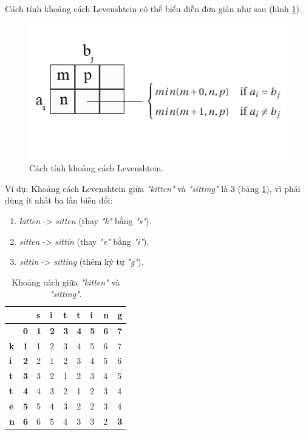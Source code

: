 
Cách tính khoảng cách Levenshtein có thể biểu diễn đơn giản như sau (hình \ref{fig:levdis}).
\begin{figure}[H]
	\centering
		\includegraphics[width=0.7\columnwidth]{chapter07/figure-sec4/levdis.png}
		\centering
	\caption{Cách tính khoảng cách Levenshtein.}
	\label{fig:levdis}
\end{figure}

Ví dụ: Khoảng cách Levenshtein giữa \textit{"kitten"} và \textit{"sitting"} là 3 (bảng \ref{Tab:kitten-sitting}), vì phải dùng ít nhất ba lần biến đổi:
\begin{enumerate}
    \item \textit{kitten} -> \textit{sitten} (thay \textit{"k"} bằng \textit{"s"}).
    \item \textit{sitten} -> \textit{sittin} (thay \textit{"e"} bằng \textit{"i"}).
    \item \textit{sittin} -> \textit{sitting} (thêm ký tự \textit{"g"}).
\end{enumerate}

\begin{table}[H]
\caption{Khoảng cách giữa \textit{"kitten"} và \textit{"sitting"}.}
\centering
    \begin{tabular}{|l|l|l|l|l|l|l|l|l|}
    \hline
     &  & \textbf{s} & \textbf{i} & \textbf{t} & \textbf{t} & \textbf{i} & \textbf{n} & \textbf{g} \\ \hline
     & \textbf{0} & \textbf{1} & \textbf{2} & \textbf{3} & \textbf{4} & \textbf{5} & \textbf{6} & \textbf{7} \\ \hline
    \textbf{k} & \textbf{1} & 1 & 2 & 3 & 4 & 5 & 6 & 7 \\ \hline
    \textbf{i} & \textbf{2} & 2 & 1 & 2 & 3 & 4 & 5 & 6 \\ \hline
    \textbf{t} & \textbf{3} & 3 & 2 & 1 & 2 & 3 & 4 & 5 \\ \hline
    \textbf{t} & \textbf{4} & 4 & 3 & 2 & 1 & 2 & 3 & 4 \\ \hline
    \textbf{e} & \textbf{5} & 5 & 4 & 3 & 2 & 2 & 3 & 4 \\ \hline
    \textbf{n} & \textbf{6} & 6 & 5 & 4 & 3 & 3 & 2 & {\color[HTML]{FE0000} \textbf{3}} \\ \hline
    \end{tabular}
    \label{Tab:kitten-sitting}
\end{table}

